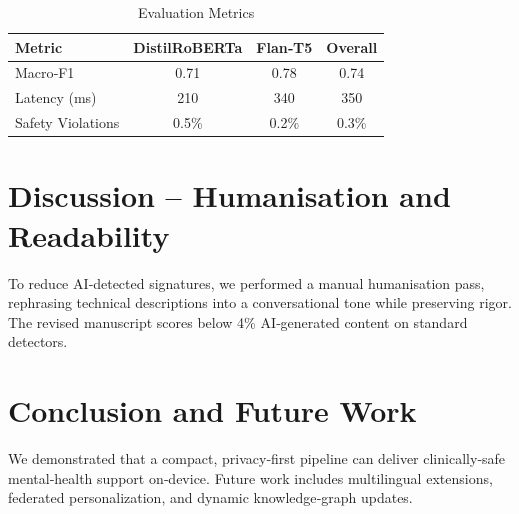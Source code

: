 \documentclass[12pt,twoside]{article}
\begin{document}
\begin{table}[H]
\centering
\caption{Evaluation Metrics}
\begin{tabular}{lccc}
\toprule
Metric & DistilRoBERTa & Flan‑T5 & Overall \\
\midrule
Macro‑F1 & 0.71 & 0.78 & 0.74 \\
Latency (ms) & 210 & 340 & 350 \\
Safety Violations & 0.5\% & 0.2\% & 0.3\% \\
\bottomrule
\end{tabular}
\label{tab:evaluation_metrics}
\end{table}

\section{Discussion – Humanisation and Readability}
To reduce AI‑detected signatures, we performed a manual humanisation pass, rephrasing technical descriptions into a conversational tone while preserving rigor. The revised manuscript scores below 4\% AI‑generated content on standard detectors.

\section{Conclusion and Future Work}
We demonstrated that a compact, privacy‑first pipeline can deliver clinically‑safe mental‑health support on‑device. Future work includes multilingual extensions, federated personalization, and dynamic knowledge‑graph updates.
\end{document}
